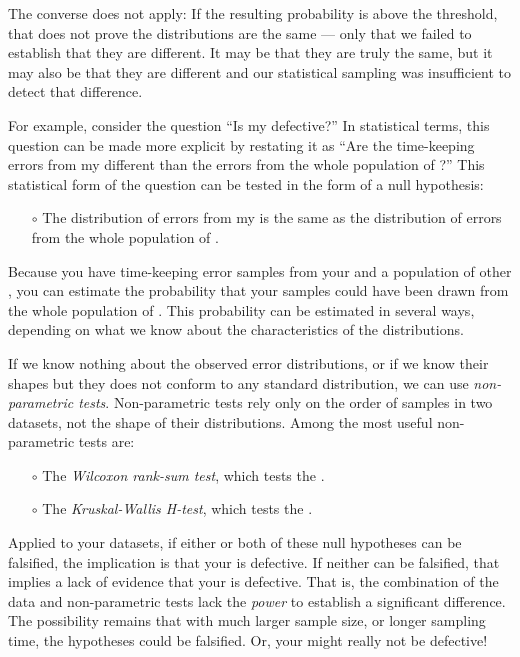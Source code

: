 The converse does not apply: 
If the resulting probability is above the threshold, that does not prove the distributions are the same --- only that we failed to establish that they are different.
It may be that they are truly the same, but it may also be that they are different and our statistical sampling was insufficient to detect that difference.

For example, consider the question ``Is my \rtc defective?'' 
In statistical terms, this question can be made more explicit by restating it as ``Are the time-keeping errors from my \rtc different than the errors from the whole population of \rtcs?''
This statistical form of the question can be tested in the form of a null hypothesis: 
\begin{itemize}
	\item[$\circ$]The distribution of errors from my \rtc is the same as the distribution of errors from the  whole population of \rtcs.
\end{itemize}
Because you have time-keeping error samples from your \rtc and a population of other \rtcs, you can estimate the probability that your samples could have been drawn from the whole population of \rtcs.
This probability can be estimated in several ways, depending on what we know about the characteristics of the distributions. 

If we know nothing about the observed error distributions, or if we know their shapes but they does not conform to any standard distribution, we can use \emph{non-parametric tests}.
Non-parametric tests rely only on the order of samples in two datasets, not the shape of their distributions.
Among the most useful non-parametric tests are:
\begin{itemize}
	\item[$\circ$] The \emph{Wilcoxon rank-sum test}, which tests the . 
	\item[$\circ$] The \emph{Kruskal-Wallis H-test}, which tests the  .
\end{itemize}
Applied to your datasets, if either or both of these null hypotheses can be falsified, the implication is that your \rtc is defective.
If neither can be falsified, that implies a lack of evidence that your \rtc is defective. 
That is, the combination of the data and non-parametric tests lack the \emph{power} to establish a significant difference.
The possibility remains that with much larger sample size, or longer sampling time, the hypotheses could be falsified. 
Or, your \rtc might really not be defective!

